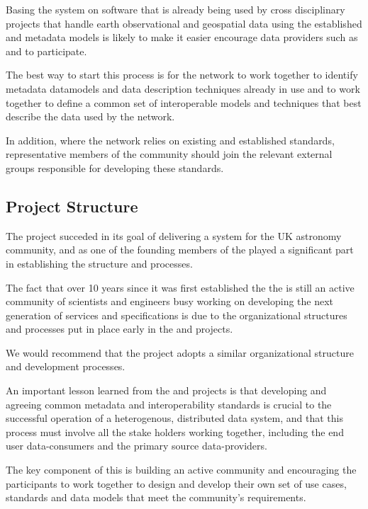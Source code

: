 \documentclass{article}
\begin{document}
Basing the \cite{atrop} system on software that is already being used by cross
disciplinary projects that handle earth observational and geospatial data
using the established \cite{gis} and \cite{eml} metadata models is likely
to make it easier encourage data providers such as \cite{nasa-jpl-carbon}
and \cite{whrc} to participate.

The best way to start this process is for the \cite{tropo} network to work
together to identify metadata datamodels and data description techniques
already in use and to work together to define a common set of interoperable
models and techniques that best describe the data used by the \cite{tropo}
network.

In addition, where the \cite{tropo} network relies on existing and established
standards, representative members of the \cite{atrop} community should join
the relevant external groups responsible for developing these standards.

\subsection{Project Structure}

The \cite{astro} project succeded in its goal of delivering a \cite{vo}
system for the UK astronomy community, and as one of the founding members
of the \cite{ivoa} played a significant part in establishing the \cite{ivoa}
structure and processes.

The fact that over 10 years since it was first established the the \cite{ivoa}
is still an active community of scientists and engineers busy working on
developing the next generation of services and specifications is due to the
organizational structures and processes put in place early in the
\cite{astro} and \cite{ivoa} projects.

We would recommend that the \cite{atrop} project adopts a similar
organizational structure and development processes.

An important lesson learned from the \cite{astro} and \cite{ivoa}
projects is that developing and agreeing common metadata and
interoperability standards is crucial to the successful operation
of a heterogenous, distributed data system, and that this process
must involve all the stake holders working together, including
the end user data-consumers and the primary source data-providers. 

The key component of this is building an active community and
encouraging the participants to work together to design and develop
their own set of use cases, standards and data models that meet the
community's requirements.
\end{document}
